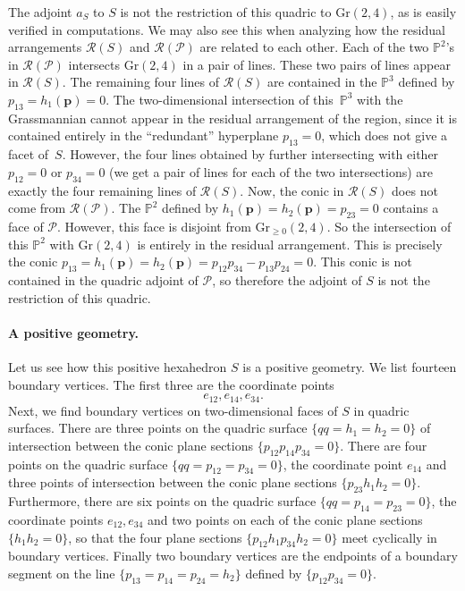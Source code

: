 \documentclass[12pt]{extarticle}
\theoremstyle{definition}
\newenvironment{example}
{\pushQED{\qed}\renewcommand{\qedsymbol}{$\diamond$}\examplex}
{\popQED\endexamplex}
\begin{document}
\begin{example}
   The adjoint $a_S$ to $S$ is not the restriction of this quadric to $\mathrm{Gr}(2,4)$, as is easily verified in computations. 
    We may also see this when analyzing how the residual arrangements $\mathcal{R}(S)$ and $\mathcal{R}(\mathcal{P})$ are related to each other. Each of the two $\mathbb{P}^2$'s in $\mathcal{R}(\mathcal{P})$ intersects $\mathrm{Gr}(2,4)$ in a pair of lines. These two pairs of lines appear in $\mathcal{R}(S)$. The remaining four lines of $\mathcal{R}(S)$ are contained in the $\mathbb{P}^3$ defined by $p_{13}=h_1(\mathbf{p})=0$. The two-dimensional intersection of this~$\mathbb{P}^3$ with the Grassmannian cannot appear in the residual arrangement of the region, since it is contained entirely in the ``redundant'' hyperplane $p_{13}=0$, which does not give a facet of~$S$. However, the four lines obtained by further intersecting with either $p_{12} =0$ or $p_{34}=0$ (we get a pair of lines for each of the two intersections) are exactly the four remaining lines of $\mathcal{R}(S)$.
    Now, the conic in $\mathcal{R}(S)$ does not come from $\mathcal{R}(\mathcal{P})$. The $\mathbb{P}^2$ defined by $h_1(\mathbf{p}) = h_2(\mathbf{p}) = p_{23} = 0$ contains a face of $\mathcal{P}$. However, this face is disjoint from $\mathrm{Gr}_{\geq 0}(2,4)$. So the intersection of this $\mathbb{P}^2$ with $\mathrm{Gr}(2,4)$ is entirely in the residual arrangement. This is precisely the conic $p_{13} = h_1(\mathbf{p}) = h_2(\mathbf{p}) = p_{12}p_{34} - p_{13}p_{24}= 0$.
This conic is not contained in the quadric adjoint of $\mathcal{P}$, so therefore the adjoint of $S$ is not the restriction of this quadric. 

\paragraph{A positive geometry.}
Let us see how this positive hexahedron $S$ is a positive geometry.
We list fourteen boundary vertices.  The first three are the coordinate points $$e_{12},e_{14},e_{34}.$$
Next, we find boundary vertices on two-dimensional faces of $S$ in quadric surfaces. There are three points on the quadric surface $\{qq=h_1=h_2=0\}$ of intersection between the conic plane sections $\{p_{12}p_{14}p_{34}=0\}$. There are four points on the quadric surface $\{qq=p_{12}=p_{34}=0\}$, the coordinate point $e_{14}$ and three points of intersection between the conic plane sections $\{p_{23}h_1h_2=0\}$.
Furthermore, there are six points on the quadric surface $\{qq=p_{14}=p_{23}=0\}$, the coordinate points $e_{12}, e_{34}$ and two points  on  each of the conic plane sections $\{h_1h_2=0\}$, so that the four plane sections $\{p_{12}h_1p_{34}h_2=0\}$ meet cyclically in boundary vertices. Finally two boundary vertices are the endpoints of a boundary segment on the line $\{p_{13}=p_{14}=p_{24}=h_2\}$ defined by $\{p_{12}p_{34}=0\}$.


\end{example}
\end{document}
